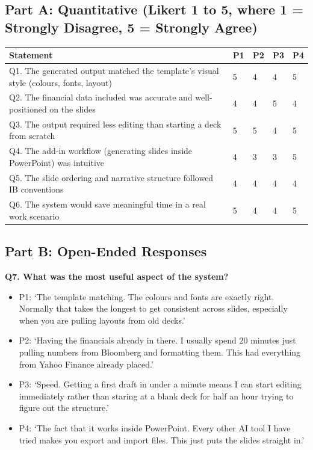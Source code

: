 \subsection*{Part A: Quantitative (Likert 1 to 5, where 1 = Strongly Disagree, 5 = Strongly Agree)}

\begin{longtable}{|p{6cm}|l|l|l|l|}
\hline
\rowcolor{gray!20} \textbf{Statement} & \textbf{P1} & \textbf{P2} & \textbf{P3} & \textbf{P4} \\
\hline
Q1. The generated output matched the template's visual style (colours, fonts, layout) & 5 & 4 & 4 & 5 \\
\hline
Q2. The financial data included was accurate and well-positioned on the slides & 4 & 4 & 5 & 4 \\
\hline
Q3. The output required less editing than starting a deck from scratch & 5 & 5 & 4 & 5 \\
\hline
Q4. The add-in workflow (generating slides inside PowerPoint) was intuitive & 4 & 3 & 3 & 5 \\
\hline
Q5. The slide ordering and narrative structure followed IB conventions & 4 & 4 & 4 & 4 \\
\hline
Q6. The system would save meaningful time in a real work scenario & 5 & 4 & 4 & 5 \\
\hline
\end{longtable}

\subsection*{Part B: Open-Ended Responses}

\textbf{Q7. What was the most useful aspect of the system?}

\begin{itemize}
    \item P1: `The template matching. The colours and fonts are exactly right. Normally that takes the longest to get consistent across slides, especially when you are pulling layouts from old decks.'
    \item P2: `Having the financials already in there. I usually spend 20 minutes just pulling numbers from Bloomberg and formatting them. This had everything from Yahoo Finance already placed.'
    \item P3: `Speed. Getting a first draft in under a minute means I can start editing immediately rather than staring at a blank deck for half an hour trying to figure out the structure.'
    \item P4: `The fact that it works inside PowerPoint. Every other AI tool I have tried makes you export and import files. This just puts the slides straight in.'
\end{itemize}

